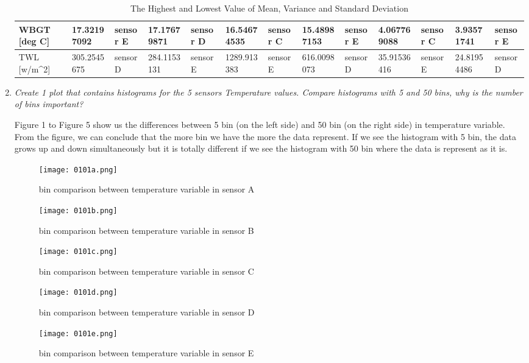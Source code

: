 \documentclass[a4paper,12pt]{article} %
\begin{document}
\begin{enumerate}
\begin{table} [H]
{\begin{tabular}{|l|l|l|l|l|l|l|l|l|l|l|l|l|}
WBGT {[}deg C{]}                                         & 17.32197092              & sensor E                    & 17.17679871              & sensor D                    & 16.54674535              & sensor C                    & 15.48987153              & sensor E                    & 4.067769088              & sensor C                    & 3.93571741               & sensor E                    \\ \hline
TWL {[}w/m\textasciicircum{}2{]}                         & 305.2545675              & sensor D                    & 284.1153131              & sensor E                    & 1289.913383              & sensor E                    & 616.0098073              & sensor D                    & 35.91536416              & sensor E                    & 24.81954486              & sensor D                    \\ \hline
\end{tabular}
}
\caption{\label{tab:table-name}The Highest and Lowest Value of Mean, Variance and Standard Deviation}
\end{table}

\item {\it Create 1 plot that contains histograms for the 5 sensors Temperature values. Compare histograms with 5 and 50 bins, why is the number of bins important?}

Figure 1 to Figure 5 show us the differences between 5 bin (on the left side) and 50 bin (on the right side) in temperature variable. From the figure, we can conclude that the more bin we have the more the data represent. If we see the histogram with 5 bin, the data grows up and down simultaneously but it is totally different if we see the histogram with 50 bin where the data is represent as it is.

\setlength{\belowcaptionskip}{-15pt}
\begin{figure}[H]
    \centering
    \texttt{[image: 0101a.png]}
    \caption{bin comparison between temperature variable in sensor A}
    \label{fig:my_label}
\end{figure}
\begin{figure}[H]
    \centering
    \texttt{[image: 0101b.png]}
    \caption{bin comparison between temperature variable in sensor B}
    \label{fig:my_label}
\end{figure}
\begin{figure}[H]
    \centering
    \texttt{[image: 0101c.png]}
    \caption{bin comparison between temperature variable in sensor C}
    \label{fig:my_label}
\end{figure}
\begin{figure}[H]
    \centering
    \texttt{[image: 0101d.png]}
    \caption{bin comparison between temperature variable in sensor D}
    \label{fig:my_label}
\end{figure}
\begin{figure}[H]
    \centering
    \texttt{[image: 0101e.png]}
    \caption{bin comparison between temperature variable in sensor E}
    \label{fig:my_label}
\end{figure}



\end{enumerate}
\end{document}
